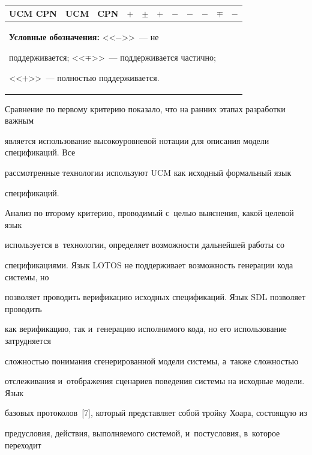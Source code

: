 \begin{table}
\begin{center}
\begin{tabular}{|l|c|c|c|c|c|c|c|c|c|c|}
\hline

UCM CPN & UCM & CPN & $+$& $\pm$ & $+$& $-$ & $-$ & $-$ & $\mp$ & $-$\\

\hline

\multicolumn{11}{p{127mm}}{\footnotesize 

\hspace*{3mm}\textbf{Условные обозначения:} <<$-$>>~--- не

поддерживается; <<$\mp$>>~--- поддерживается частично; 

<<$+$>>~--- полностью поддерживается.}

\end{tabular}

\end{center}

\vspace*{-12pt}

\end{table}



  Сравнение по первому критерию показало, что на ранних этапах разработки важным

является использование высокоуровневой нотации для описания модели спецификаций. Все

рассмотренные технологии используют UCM как исходный формальный язык

спецификаций.



  Анализ по второму критерию, проводимый с~целью выяснения, какой целевой язык

используется в~технологии, определяет возможности дальнейшей работы со

спецификациями. Язык LOTOS не поддерживает возможность генерации кода системы, но

позволяет проводить верификацию исходных спецификаций. Язык SDL позволяет проводить

как верификацию, так и~генерацию исполнимого кода, но его использование затрудняется

сложностью понимания сгенерированной модели системы, а~также сложностью

отслеживания и~отображения сценариев поведения системы на исходные модели. Язык

базовых протоколов~[7], который представляет собой тройку Хоара, состоящую из

предусловия, действия, выполняемого системой, и~постусловия, в~которое переходит

